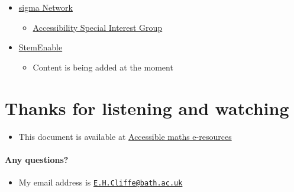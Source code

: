 \documentclass[
  10pt,
  english,
  a4paper]{article}
\providecommand{\tightlist}{%
  \setlength{\itemsep}{0pt}\setlength{\parskip}{0pt}}
\theoremstyle{plain}
\theoremstyle{plain}
\theoremstyle{plain}
\theoremstyle{plain}
\theoremstyle{plain}
\theoremstyle{definition}
\theoremstyle{definition}
\theoremstyle{definition}
\theoremstyle{remark}
\begin{document}
\begin{itemize}
\tightlist
\item
  \href{http://www.sigma-network.ac.uk/}{sigma Network}

  \begin{itemize}
  \tightlist
  \item
    \href{http://www.sigma-network.ac.uk/sigs/accessibility-sig/}{Accessibility Special Interest Group}
  \end{itemize}
\item
  \href{http://www.stem-enable.org.uk}{StemEnable}

  \begin{itemize}
  \tightlist
  \item
    Content is being added at the moment
  \end{itemize}
\end{itemize}

\hypertarget{thanks-for-listening-and-watching}{%
\section{Thanks for listening and watching}\label{thanks-for-listening-and-watching}}

\begin{itemize}
\tightlist
\item
  This document is available at \href{https://stem-enable.github.io/Accessibility-of-maths-e-resources/index.html}{Accessible maths e-resources}
\end{itemize}

\hypertarget{any-questions}{%
\paragraph{Any questions?}\label{any-questions}}

\begin{itemize}
\tightlist
\item
  My email address is \href{mailto:E.H.Cliffe@bath.ac.uk}{\nolinkurl{E.H.Cliffe@bath.ac.uk}}
\end{itemize}
\end{document}
